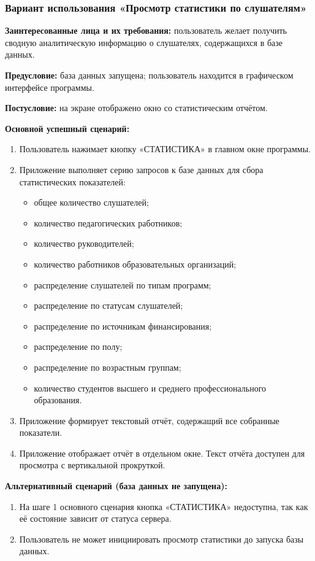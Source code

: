 \subsubsection{Вариант использования «Просмотр статистики по слушателям»}

\textbf{Заинтересованные лица и их требования:} пользователь желает получить сводную аналитическую информацию о слушателях, содержащихся в базе данных.

\textbf{Предусловие:} база данных запущена; пользователь находится в графическом интерфейсе программы.

\textbf{Постусловие:} на экране отображено окно со статистическим отчётом.

\textbf{Основной успешный сценарий:}
\begin{enumerate}
	\item Пользователь нажимает кнопку «СТАТИСТИКА» в главном окне программы.
	\item Приложение выполняет серию запросов к базе данных для сбора статистических показателей:
	\begin{itemize}
		\item общее количество слушателей;
		\item количество педагогических работников;
		\item количество руководителей;
		\item количество работников образовательных организаций;
		\item распределение слушателей по типам программ;
		\item распределение по статусам слушателей;
		\item распределение по источникам финансирования;
		\item распределение по полу;
		\item распределение по возрастным группам;
		\item количество студентов высшего и среднего профессионального образования.
	\end{itemize}
	\item Приложение формирует текстовый отчёт, содержащий все собранные показатели.
	\item Приложение отображает отчёт в отдельном окне. Текст отчёта доступен для просмотра с вертикальной прокруткой.
\end{enumerate}

\textbf{Альтернативный сценарий (база данных не запущена):}
\begin{enumerate}
	\item На шаге 1 основного сценария кнопка «СТАТИСТИКА» недоступна, так как её состояние зависит от статуса сервера.
	\item Пользователь не может инициировать просмотр статистики до запуска базы данных.
\end{enumerate}

